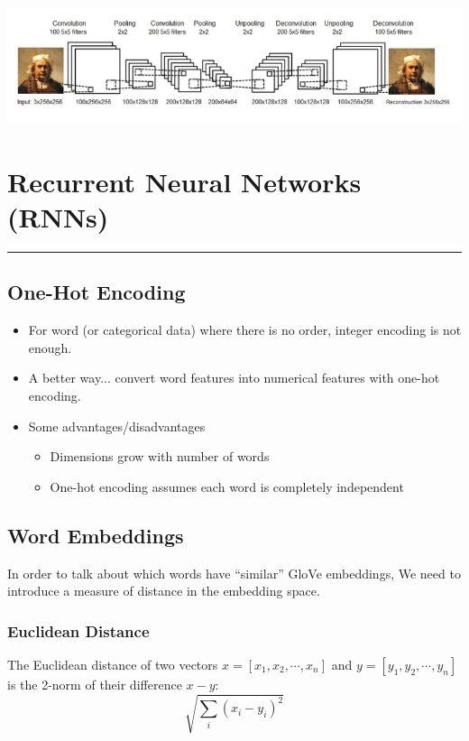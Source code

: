 \documentclass[11pt]{article}
\begin{document}
\begin{center}
\includegraphics[scale=1.2]{images/auto.png}
\end{center}


\pagebreak

\section{Recurrent Neural Networks (RNNs)}
\hrule \vspace{15pt}

\subsection{One-Hot Encoding}
\begin{itemize}
\item For word (or categorical data) where there is no order, integer encoding is not enough.
\item A better way... convert word features into numerical features with one-hot encoding. 
\item Some advantages/disadvantages
\begin{itemize}
\item Dimensions grow with number of words
\item One-hot encoding assumes each word is completely independent
\end{itemize}
\end{itemize}

\subsection{Word Embeddings}
In order to talk about which words have “similar” GloVe embeddings, We need to introduce a measure of distance in the embedding space.

\subsubsection{Euclidean Distance}
The Euclidean distance of two vectors $x = [x_1, x_2, \cdots, x_n]$ and $y = [y_1, y_2,  \cdots, y_n]$ is the 2-norm of their difference $x-y$:
$$\sqrt{\sum_i (x_i - y_i)^2}$$
\end{document}
